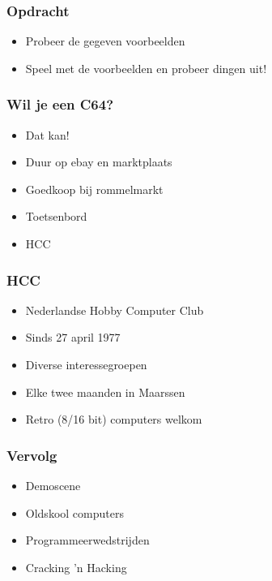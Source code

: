 \documentclass[aspectratio=43]{uva-inf-presentation}
\begin{document}

\begin{frame}
\frametitle{Opdracht}

\begin{itemize}
\item Probeer de gegeven voorbeelden
\item Speel met de voorbeelden en probeer dingen uit!
\end{itemize}

\end{frame}


\begin{frame}
\frametitle{Wil je een C64?}

\begin{itemize}
\item Dat kan!
\item Duur op ebay en marktplaats
\item Goedkoop bij rommelmarkt
\item Toetsenbord
\item HCC
\end{itemize}

\end{frame}


\begin{frame}
\frametitle{HCC}

\begin{itemize}
\item Nederlandse Hobby Computer Club
\item Sinds 27 april 1977
\item Diverse interessegroepen
\item Elke twee maanden in Maarssen
\item Retro (8/16 bit) computers welkom
\end{itemize}

\end{frame}


\begin{frame}
\frametitle{Vervolg}

\begin{itemize}
\item Demoscene
\item Oldskool computers
\item Programmeerwedstrijden
\item Cracking 'n Hacking
\end{itemize}

\end{frame}
\end{document}
